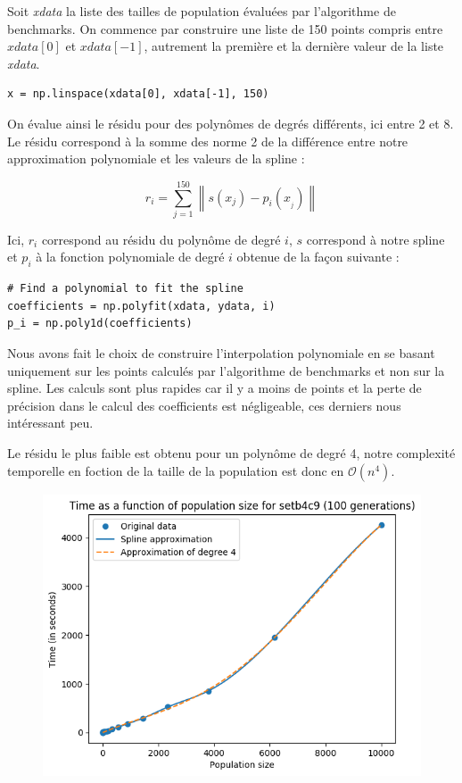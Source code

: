 Soit \textit{xdata} la liste des tailles de population évaluées par l'algorithme de benchmarks. On commence par construire une liste de 150 points compris entre $xdata[0]$ et $xdata[-1]$, autrement la première et la dernière valeur de la liste \textit{xdata}.

\begin{lstlisting}
x = np.linspace(xdata[0], xdata[-1], 150)
\end{lstlisting}

On évalue ainsi le résidu pour des polynômes de degrés différents, ici entre 2 et 8. Le résidu correspond à la somme des norme 2 de la différence entre notre approximation polynomiale et les valeurs de la spline :

$$ r_i = \sum_{j = 1}^{150} \left\| s(x_j) - p_i(x__j) \right\| $$

Ici, $r_i$ correspond au résidu du polynôme de degré $i$, $s$ correspond à notre spline et $p_i$ à la fonction polynomiale de degré $i$ obtenue de la façon suivante :

\begin{lstlisting}
# Find a polynomial to fit the spline
coefficients = np.polyfit(xdata, ydata, i)
p_i = np.poly1d(coefficients)
\end{lstlisting}

Nous avons fait le choix de construire l'interpolation polynomiale en se basant uniquement sur les points calculés par l'algorithme de benchmarks et non sur la spline. Les calculs sont plus rapides car il y a moins de points et la perte de précision dans le calcul des coefficients est négligeable, ces derniers nous intéressant peu.

Le résidu le plus faible est obtenu pour un polynôme de degré 4, notre complexité temporelle en foction de la taille de la population est donc en $\mathcal{O}(n^4)$.

\begin{figure}[!h]
    \centering
    \includegraphics[]{report/Pictures/setb4c9_benchmarks_population_approximated.png}
\end{figure}

